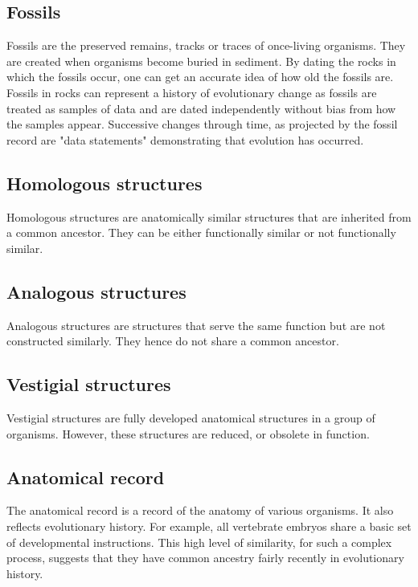 \documentclass[11pt]{article}
\begin{document}
\subsection{Fossils}
\label{sec:org03adceb}
Fossils are the preserved remains, tracks or traces of once-living organisms. They are created when organisms become buried in sediment. By dating the rocks in which the fossils occur, one can get an accurate idea of how old the fossils are.
\\[0pt]

Fossils in rocks can represent a history of evolutionary change as fossils are treated as samples of data and are dated independently without bias from how the samples appear. Successive changes through time, as projected by the fossil record are "data statements" demonstrating that evolution has occurred.

\subsection{Homologous structures}
\label{sec:org96569e6}
Homologous structures are anatomically similar structures that are inherited from a common ancestor. They can be either functionally similar or not functionally similar.

\subsection{Analogous structures}
\label{sec:org75fa35e}
Analogous structures are structures that serve the same function but are not constructed similarly. They hence do not share a common ancestor.

\subsection{Vestigial structures}
\label{sec:org5c80af9}
Vestigial structures are fully developed anatomical structures in a group of organisms. However, these structures are reduced, or obsolete in function.

\subsection{Anatomical record}
\label{sec:orgc0f3b04}
The anatomical record is a record of the anatomy of various organisms. It also reflects evolutionary history. For example, all vertebrate embryos share a basic set of developmental instructions. This high level of similarity, for such a complex process, suggests that they have common ancestry fairly recently in evolutionary history.
\\[0pt]
\end{document}
